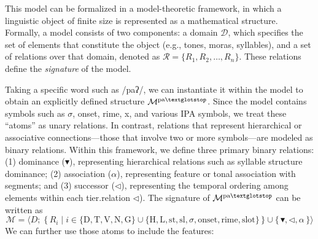 \documentclass[11pt]{article}
\begin{document}
This model can be formalized in a model-theoretic framework, in which a linguistic 
object of finite size is represented as a mathematical structure. Formally, a 
model consists of two components: a domain $\mathcal{D}$, which specifies the set 
of elements that constitute the object (e.g., tones, moras, syllables), and a set 
of relations over that domain, denoted as $\mathcal{R} = \{ R_1, R_2, \dots, R_n 
\}$. These relations define the \textit{signature }of the model.

Taking a specific word such as /paʔ/, we can instantiate it within the model to 
obtain an explicitly defined structure $\mathcal{M}^{\text{pa\textglotstop}}$. 
Since the model contains symbols such as $\sigma$, \textsf{onset}, \textsf{rime}, 
\textsf{x}, and various IPA symbols, we treat these “atoms” as unary relations. In 
contrast, relations that represent hierarchical or associative connections—those 
that involve two or more symbols—are modeled as binary relations. Within this 
framework, we define three primary binary relations: (1) dominance ($\blacktriangledown$), 
representing hierarchical relations such as syllable structure dominance;
(2) association ($\alpha$), representing feature or tonal association with 
segments; and
(3) successor ($\lhd$), representing the temporal ordering among elements within 
each tier.relation $\lhd$). The signature of $\mathcal{M}^{\text{pa\textglotstop}}$ can be written as
\[
\mathcal{M}
= \langle 
D;\;
\{\, R_i \mid i \in 
\{\text{D}, \text{T}, \text{V}, \text{N},\text{G}\}
\cup
\{\text{H}, \text{L}, \text{st}, \text{sl}, \sigma, \text{onset}, \text{rime}, \text{slot}\} \,\}
\cup
\{\,\blacktriangledown, \lhd, \alpha\,\}
\rangle
\]
We can further use those atoms to include the  features:


\end{document}

